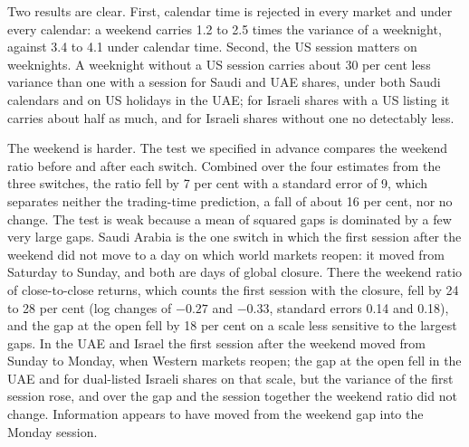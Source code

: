 Two results are clear. First, calendar time is rejected in every market and under every calendar: a weekend carries 1.2 to 2.5 times the variance of a weeknight, against 3.4 to 4.1 under calendar time. Second, the US session matters on weeknights. A weeknight without a US session carries about 30 per cent less variance than one with a session for Saudi and UAE shares, under both Saudi calendars and on US holidays in the UAE; for Israeli shares with a US listing it carries about half as much, and for Israeli shares without one no detectably less.

The weekend is harder. The test we specified in advance compares the weekend ratio before and after each switch. Combined over the four estimates from the three switches, the ratio fell by 7 per cent with a standard error of 9, which separates neither the trading-time prediction, a fall of about 16 per cent, nor no change. The test is weak because a mean of squared gaps is dominated by a few very large gaps. Saudi Arabia is the one switch in which the first session after the weekend did not move to a day on which world markets reopen: it moved from Saturday to Sunday, and both are days of global closure. There the weekend ratio of close-to-close returns, which counts the first session with the closure, fell by 24 to 28 per cent (log changes of $-0.27$ and $-0.33$, standard errors 0.14 and 0.18), and the gap at the open fell by 18 per cent on a scale less sensitive to the largest gaps. In the UAE and Israel the first session after the weekend moved from Sunday to Monday, when Western markets reopen; the gap at the open fell in the UAE and for dual-listed Israeli shares on that scale, but the variance of the first session rose, and over the gap and the session together the weekend ratio did not change. Information appears to have moved from the weekend gap into the Monday session.

